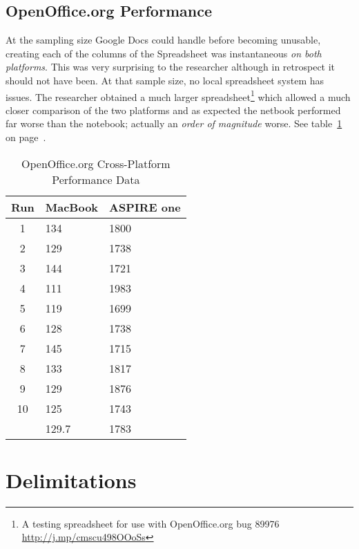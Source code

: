 \subsection{OpenOffice.org Performance}

At the sampling size Google Docs could handle before becoming unusable, creating
each of the columns of the Spreadsheet was instantaneous \emph{on both
  platforms}.  This was very surprising to the researcher although in retrospect
it should not have been.  At that sample size, no local spreadsheet system has
issues.  The researcher obtained a much larger spreadsheet\footnote{A testing
  spreadsheet for use with OpenOffice.org bug 89976
  \url{http://j.mp/cmscu498OOoSs}} which allowed a much closer comparison of the
two platforms and as expected the netbook performed far worse than the notebook;
actually an \emph{order of magnitude} worse. See table~\ref{ooCp} on page~\pageref{ooCp}.

\begin{table}
  \begin{tabular}{| c | l | l |}
    \hline
    Run  & MacBook & ASPIRE one \\ \hline
    1    & 134     & 1800       \\ \hline
    2    & 129     & 1738       \\ \hline
    3    & 144     & 1721       \\ \hline
    4    & 111     & 1983       \\ \hline
    5    & 119     & 1699       \\ \hline
    6    & 128     & 1738       \\ \hline
    7    & 145     & 1715       \\ \hline
    8    & 133     & 1817       \\ \hline
    9    & 129     & 1876       \\ \hline
    10   & 125     & 1743       \\ \hline
         & 129.7   & 1783       \\
    \hline
  \end{tabular}
  \caption{OpenOffice.org Cross-Platform Performance Data}
  \label{ooCp}
\end{table}

\section{Delimitations}


